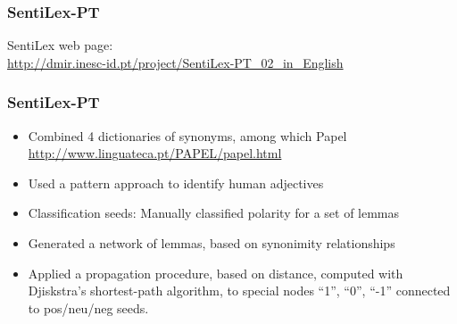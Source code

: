 \documentclass[t]{beamer}
\begin{document}

\begin{frame} \frametitle{SentiLex-PT}



\vfill SentiLex web page: \\
\url{http://dmir.inesc-id.pt/project/SentiLex-PT_02_in_English}

\end{frame}

\begin{frame} \frametitle{SentiLex-PT}

\begin{itemize}
\item Combined 4 dictionaries of synonyms, among which Papel \url{http://www.linguateca.pt/PAPEL/papel.html}

\item Used a pattern approach to identify human adjectives

\item Classification seeds: Manually classified polarity for a set of lemmas

\item Generated a network of lemmas, based on synonimity relationships

\item Applied a propagation procedure, based on distance, computed with
Djiskstra's shortest-path algorithm, to special nodes ``1'', ``0'',
``-1'' connected to pos/neu/neg seeds.
\end{itemize}

\end{frame}
\end{document}
